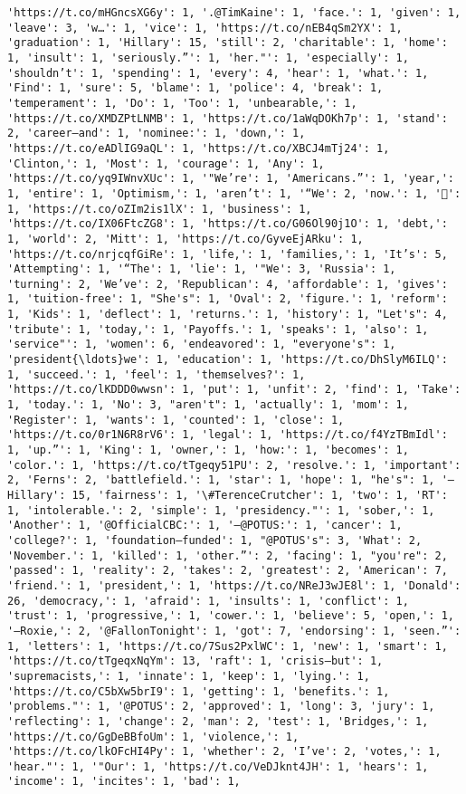 \documentclass[11pt]{article}
\begin{document}
\begin{Verbatim}[commandchars=\\\{\}]
'https://t.co/mHGncsXG6y': 1, '.@TimKaine': 1, 'face.': 1, 'given': 1, 'leave': 3, 'w…': 1, 'vice': 1, 'https://t.co/nEB4qSm2YX': 1, 'graduation': 1, 'Hillary': 15, 'still': 2, 'charitable': 1, 'home': 1, 'insult': 1, 'seriously.”': 1, 'her."': 1, 'especially': 1, 'shouldn’t': 1, 'spending': 1, 'every': 4, 'hear': 1, 'what.': 1, 'Find': 1, 'sure': 5, 'blame': 1, 'police': 4, 'break': 1, 'temperament': 1, 'Do': 1, 'Too': 1, 'unbearable,': 1, 'https://t.co/XMDZPtLNMB': 1, 'https://t.co/1aWqDOKh7p': 1, 'stand': 2, 'career—and': 1, 'nominee:': 1, 'down,': 1, 'https://t.co/eADlIG9aQL': 1, 'https://t.co/XBCJ4mTj24': 1, 'Clinton,': 1, 'Most': 1, 'courage': 1, 'Any': 1, 'https://t.co/yq9IWnvXUc': 1, '"We’re': 1, 'Americans.”': 1, 'year,': 1, 'entire': 1, 'Optimism,': 1, 'aren’t': 1, '“We': 2, 'now.': 1, '🎤': 1, 'https://t.co/oZIm2is1lX': 1, 'business': 1, 'https://t.co/IX06FtcZG8': 1, 'https://t.co/G06Ol90j1O': 1, 'debt,': 1, 'world': 2, 'Mitt': 1, 'https://t.co/GyveEjARku': 1, 'https://t.co/nrjcqfGiRe': 1, 'life,': 1, 'families,': 1, 'It’s': 5, 'Attempting': 1, '“The': 1, 'lie': 1, '"We': 3, 'Russia': 1, 'turning': 2, 'We’ve': 2, 'Republican': 4, 'affordable': 1, 'gives': 1, 'tuition-free': 1, "She's": 1, 'Oval': 2, 'figure.': 1, 'reform': 1, 'Kids': 1, 'deflect': 1, 'returns.': 1, 'history': 1, "Let's": 4, 'tribute': 1, 'today,': 1, 'Payoffs.': 1, 'speaks': 1, 'also': 1, 'service"': 1, 'women': 6, 'endeavored': 1, "everyone's": 1, 'president{\ldots}we': 1, 'education': 1, 'https://t.co/DhSlyM6ILQ': 1, 'succeed.': 1, 'feel': 1, 'themselves?': 1, 'https://t.co/lKDDD0wwsn': 1, 'put': 1, 'unfit': 2, 'find': 1, 'Take': 1, 'today.': 1, 'No': 3, "aren't": 1, 'actually': 1, 'mom': 1, 'Register': 1, 'wants': 1, 'counted': 1, 'close': 1, 'https://t.co/0r1N6R8rV6': 1, 'legal': 1, 'https://t.co/f4YzTBmIdl': 1, 'up.”': 1, 'King': 1, 'owner,': 1, 'how:': 1, 'becomes': 1, 'color.': 1, 'https://t.co/tTgeqy51PU': 2, 'resolve.': 1, 'important': 2, 'Ferns': 2, 'battlefield.': 1, 'star': 1, 'hope': 1, "he's": 1, '—Hillary': 15, 'fairness': 1, '\#TerenceCrutcher': 1, 'two': 1, 'RT': 1, 'intolerable.': 2, 'simple': 1, 'presidency."': 1, 'sober,': 1, 'Another': 1, '@OfficialCBC:': 1, '—@POTUS:': 1, 'cancer': 1, 'college?': 1, 'foundation—funded': 1, "@POTUS's": 3, 'What': 2, 'November.': 1, 'killed': 1, 'other.”': 2, 'facing': 1, "you're": 2, 'passed': 1, 'reality': 2, 'takes': 2, 'greatest': 2, 'American': 7, 'friend.': 1, 'president,': 1, 'https://t.co/NReJ3wJE8l': 1, 'Donald': 26, 'democracy,': 1, 'afraid': 1, 'insults': 1, 'conflict': 1, 'trust': 1, 'progressive,': 1, 'cower.': 1, 'believe': 5, 'open,': 1, '—Roxie,': 2, '@FallonTonight': 1, 'got': 7, 'endorsing': 1, 'seen.”': 1, 'letters': 1, 'https://t.co/7Sus2PxlWC': 1, 'new': 1, 'smart': 1, 'https://t.co/tTgeqxNqYm': 13, 'raft': 1, 'crisis—but': 1, 'supremacists,': 1, 'innate': 1, 'keep': 1, 'lying.': 1, 'https://t.co/C5bXw5brI9': 1, 'getting': 1, 'benefits.': 1, 'problems."': 1, '@POTUS': 2, 'approved': 1, 'long': 3, 'jury': 1, 'reflecting': 1, 'change': 2, 'man': 2, 'test': 1, 'Bridges,': 1, 'https://t.co/GgDeBBfoUm': 1, 'violence,': 1, 'https://t.co/lkOFcHI4Py': 1, 'whether': 2, 'I’ve': 2, 'votes,': 1, 'hear."': 1, '"Our': 1, 'https://t.co/VeDJknt4JH': 1, 'hears': 1, 'income': 1, 'incites': 1, 'bad': 1, 
\end{Verbatim}
\end{document}
